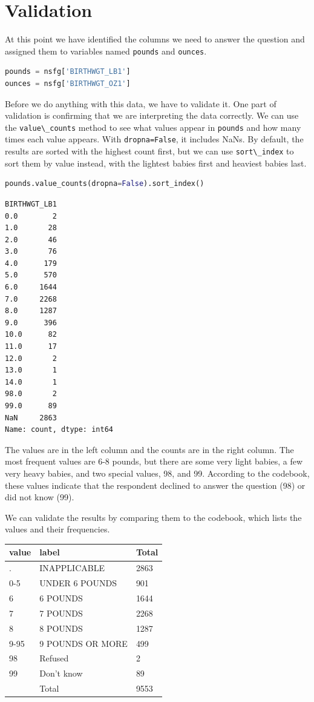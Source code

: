 \documentclass[
]{book}
\newcommand{\passthrough}[1]{#1}
\begin{document}
\section{Validation}\label{validation}

At this point we have identified the columns we need to answer the
question and assigned them to variables named
\passthrough{\lstinline!pounds!} and \passthrough{\lstinline!ounces!}.

\begin{lstlisting}[language=Python]
pounds = nsfg['BIRTHWGT_LB1']
ounces = nsfg['BIRTHWGT_OZ1']
\end{lstlisting}

Before we do anything with this data, we have to validate it. One part
of validation is confirming that we are interpreting the data correctly.
We can use the \passthrough{\lstinline!value\_counts!} method to see
what values appear in \passthrough{\lstinline!pounds!} and how many
times each value appears. With \passthrough{\lstinline!dropna=False!},
it includes NaNs. By default, the results are sorted with the highest
count first, but we can use \passthrough{\lstinline!sort\_index!} to
sort them by value instead, with the lightest babies first and heaviest
babies last.

\begin{lstlisting}[language=Python]
pounds.value_counts(dropna=False).sort_index()
\end{lstlisting}

\begin{lstlisting}
BIRTHWGT_LB1
0.0        2
1.0       28
2.0       46
3.0       76
4.0      179
5.0      570
6.0     1644
7.0     2268
8.0     1287
9.0      396
10.0      82
11.0      17
12.0       2
13.0       1
14.0       1
98.0       2
99.0      89
NaN     2863
Name: count, dtype: int64
\end{lstlisting}

The values are in the left column and the counts are in the right
column. The most frequent values are 6-8 pounds, but there are some very
light babies, a few very heavy babies, and two special values, 98, and
99. According to the codebook, these values indicate that the respondent
declined to answer the question (98) or did not know (99).

We can validate the results by comparing them to the codebook, which
lists the values and their frequencies.

\begin{longtable}[]{@{}lll@{}}
\toprule\noalign{}
value & label & Total \\
\midrule\noalign{}
\endhead
\bottomrule\noalign{}
\endlastfoot
. & INAPPLICABLE & 2863 \\
0-5 & UNDER 6 POUNDS & 901 \\
6 & 6 POUNDS & 1644 \\
7 & 7 POUNDS & 2268 \\
8 & 8 POUNDS & 1287 \\
9-95 & 9 POUNDS OR MORE & 499 \\
98 & Refused & 2 \\
99 & Don't know & 89 \\
& Total & 9553 \\
\end{longtable}
\end{document}
